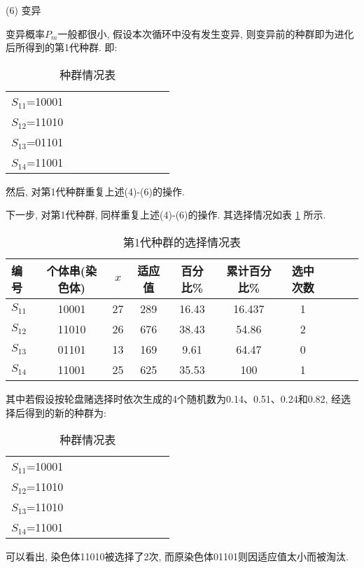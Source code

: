  (6) 变异

变异概率$P_m$一般都很小, 假设本次循环中没有发生变异, 则变异前的种群即为进化后所得到的第1代种群. 即:
\begin{table} [H]
\caption{种群情况表}
\vspace{-0.6cm}
\begin{center}
\begin{tabular} {lccccccccc}
\hline
    $S_{11}$=10001\\
    $S_{12}$=11010\\
    $S_{13}$=01101\\
    $S_{14}$=11001\\
\hline
\end{tabular}
\end{center}\vspace{-0.4cm}
\end{table}

然后, 对第1代种群重复上述(4)-(6)的操作.

下一步, 对第1代种群, 同样重复上述(4)-(6)的操作. 其选择情况如表 \ref{AI_table2019112807} 所示.
\begin{table} [H]
\caption{第1代种群的选择情况表}
\vspace{-0.6cm}
\begin{center}
\begin{tabular} {lccccccccc}
  \hline
编号	&个体串(染色体)&	 $x$	&适应值	&百分比\%	&累计百分比\%	&选中次数\\
  \hline
$S_{11}$	&10001	&27	&289	&16.43	&16.437	&1\\
$S_{12}$&	11010	&26	&676&38.43	&54.86	&2\\
$S_{13}$&	01101	&13	&169	&9.61	&64.47	&0\\
$S_{14}$	&11001	&25	&625	&35.53	&100	&1\\
\hline
\end{tabular}
\end{center}
\label{AI_table2019112807}
\vspace{-0.4cm}
\end{table}
其中若假设按轮盘赌选择时依次生成的4个随机数为0.14、0.51、0.24和0.82, 经选择后得到的新的种群为:
\begin{table} [H]
\caption{种群情况表}
\vspace{-0.6cm}
\begin{center}
    \begin{tabular} {lccccccccc}
    \hline
        $S_{11}$=10001\\
        $S_{12}$=11010\\
        $S_{13}$=11010\\
        $S_{14}$=11001\\
    \hline
    \end{tabular}
    \end{center}
    \vspace{-0.4cm}
\end{table}
可以看出, 染色体11010被选择了2次, 而原染色体01101则因适应值太小而被淘汰.

